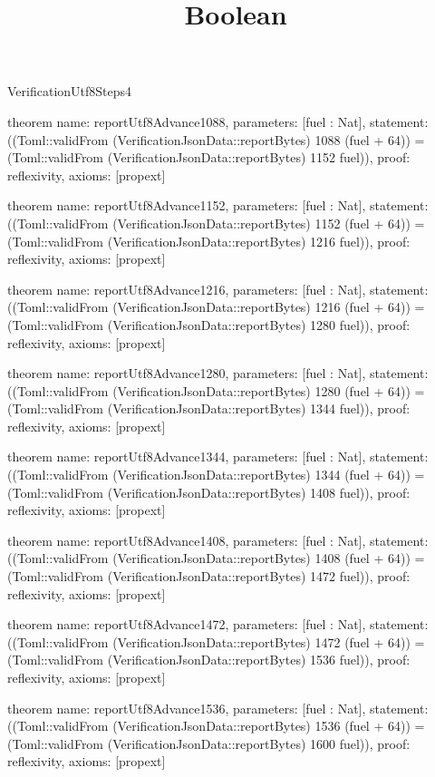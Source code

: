 \begin{lexlean}{VerificationUtf8Steps4}
\title{Boolean}
\begin{semanticmodule}

theorem{
  name: reportUtf8Advance1088,
  parameters: [fuel : Nat],
  statement: ((Toml::validFrom (VerificationJsonData::reportBytes) 1088 (fuel + 64)) = (Toml::validFrom (VerificationJsonData::reportBytes) 1152 fuel)),
  proof: reflexivity{},
  axioms: [propext]
}

theorem{
  name: reportUtf8Advance1152,
  parameters: [fuel : Nat],
  statement: ((Toml::validFrom (VerificationJsonData::reportBytes) 1152 (fuel + 64)) = (Toml::validFrom (VerificationJsonData::reportBytes) 1216 fuel)),
  proof: reflexivity{},
  axioms: [propext]
}

theorem{
  name: reportUtf8Advance1216,
  parameters: [fuel : Nat],
  statement: ((Toml::validFrom (VerificationJsonData::reportBytes) 1216 (fuel + 64)) = (Toml::validFrom (VerificationJsonData::reportBytes) 1280 fuel)),
  proof: reflexivity{},
  axioms: [propext]
}

theorem{
  name: reportUtf8Advance1280,
  parameters: [fuel : Nat],
  statement: ((Toml::validFrom (VerificationJsonData::reportBytes) 1280 (fuel + 64)) = (Toml::validFrom (VerificationJsonData::reportBytes) 1344 fuel)),
  proof: reflexivity{},
  axioms: [propext]
}

theorem{
  name: reportUtf8Advance1344,
  parameters: [fuel : Nat],
  statement: ((Toml::validFrom (VerificationJsonData::reportBytes) 1344 (fuel + 64)) = (Toml::validFrom (VerificationJsonData::reportBytes) 1408 fuel)),
  proof: reflexivity{},
  axioms: [propext]
}

theorem{
  name: reportUtf8Advance1408,
  parameters: [fuel : Nat],
  statement: ((Toml::validFrom (VerificationJsonData::reportBytes) 1408 (fuel + 64)) = (Toml::validFrom (VerificationJsonData::reportBytes) 1472 fuel)),
  proof: reflexivity{},
  axioms: [propext]
}

theorem{
  name: reportUtf8Advance1472,
  parameters: [fuel : Nat],
  statement: ((Toml::validFrom (VerificationJsonData::reportBytes) 1472 (fuel + 64)) = (Toml::validFrom (VerificationJsonData::reportBytes) 1536 fuel)),
  proof: reflexivity{},
  axioms: [propext]
}

theorem{
  name: reportUtf8Advance1536,
  parameters: [fuel : Nat],
  statement: ((Toml::validFrom (VerificationJsonData::reportBytes) 1536 (fuel + 64)) = (Toml::validFrom (VerificationJsonData::reportBytes) 1600 fuel)),
  proof: reflexivity{},
  axioms: [propext]
}

\end{semanticmodule}
\end{lexlean}
